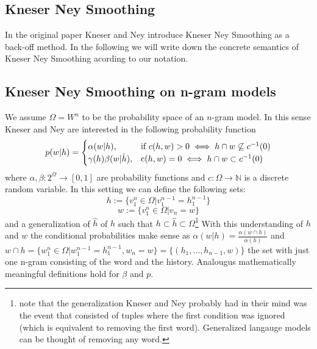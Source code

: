 \documentclass[•]{book}
\begin{document}
\begin{appendix}
\chapter{Kneser Ney Smoothing}
In the original paper Kneser and Ney introduce Kneser Ney Smoothing as a back-off method. 
In the following we will write down the concrete semantics of Kneser Ney Smoothing acording to our notation. 
\section{Kneser Ney Smoothing on n-gram models}
We assume $\Omega=W^n$ to be the probability space of an $n$-gram model. 
In this sense Kneser and Ney are interested in the following probability function
\[
p(w|h)=
\begin{cases}
  \alpha(w|h),&\text{if } c(h,w)>0 \iff h\cap w\not\subseteq c^{-1}(0)\\
  \gamma(h)\beta(w|\hat h), &\text c(h,w)=0 \iff h\cap w\subset c^{-1}(0)
\end{cases}
\]
where $\alpha,\beta: 2^\Omega \rightarrow [0,1]$ are probability functions and $c:\Omega\rightarrow \mathbb{N}$ is a discrete random variable. 
In this setting we can define the following sets:
\[
h:=\{v_1^n\in\Omega|v_1^{n-1}=h_1^{n-1}\}
\]
\[
w:=\{v_1^n\in\Omega|v_n=w\}
\]
and a generalization of $\hat h$ of $h$ such that $h\subset\hat h\subset\Omega$\footnote{note that the generalization Kneser and Ney probably had in their mind was the event that consisted of tuples where the first condition was ignored (which is equivalent to removing the first word). Generalized langauge models can be thought of removing any word.}
With this understanding of $h$ and $w$ the conditional probabilities make sense as $\alpha(w|h)=\frac{\alpha(w \cap h)}{\alpha(h)}$ and $w\cap h=\{w_1^n\in \Omega | w_1^{n-1}=h_1^{n-1}, w_n=w\} = \{(h_1,\dots,h_{n-1},w)\}$ the set with just one n-gram consisting of the word and the history.
Analougus mathematically meaningful definitions hold for $\beta$ and $p$.


\end{appendix}
\end{document}
